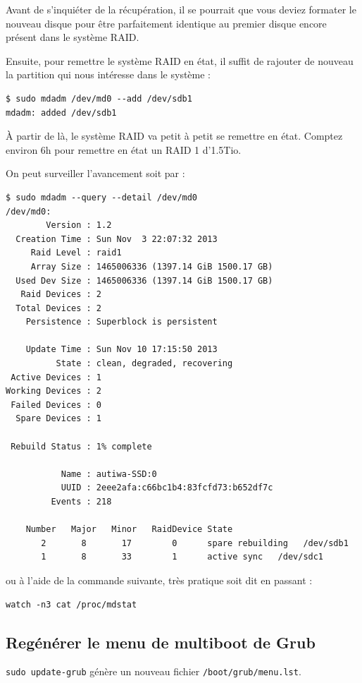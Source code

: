 \documentclass[a4paper,twoside]{article}
\begin{document}
\bigskip

\begin{remarque}
Avant de s'inquiéter de la récupération, il se pourrait que vous deviez formater le nouveau disque pour être parfaitement 
identique au premier disque encore présent dans le système RAID. 
\end{remarque}

Ensuite, pour remettre le système RAID en état, il suffit de rajouter de nouveau la partition qui nous intéresse dans le 
système : 
\begin{verbatim}
$ sudo mdadm /dev/md0 --add /dev/sdb1
mdadm: added /dev/sdb1
\end{verbatim}

À partir de là, le système RAID va petit à petit se remettre en état. Comptez environ 6h pour remettre en état un 
RAID 1 d'1.5Tio.

On peut surveiller l'avancement soit par :
\begin{verbatim}
$ sudo mdadm --query --detail /dev/md0
/dev/md0:
        Version : 1.2
  Creation Time : Sun Nov  3 22:07:32 2013
     Raid Level : raid1
     Array Size : 1465006336 (1397.14 GiB 1500.17 GB)
  Used Dev Size : 1465006336 (1397.14 GiB 1500.17 GB)
   Raid Devices : 2
  Total Devices : 2
    Persistence : Superblock is persistent

    Update Time : Sun Nov 10 17:15:50 2013
          State : clean, degraded, recovering 
 Active Devices : 1
Working Devices : 2
 Failed Devices : 0
  Spare Devices : 1

 Rebuild Status : 1% complete

           Name : autiwa-SSD:0
           UUID : 2eee2afa:c66bc1b4:83fcfd73:b652df7c
         Events : 218

    Number   Major   Minor   RaidDevice State
       2       8       17        0      spare rebuilding   /dev/sdb1
       1       8       33        1      active sync   /dev/sdc1

\end{verbatim}
ou à l'aide de la commande suivante, très pratique soit dit en passant : 
\begin{verbatim}
watch -n3 cat /proc/mdstat
\end{verbatim}


\subsection{Regénérer le menu de multiboot de Grub}
\verb|sudo update-grub| génère un nouveau fichier \verb|/boot/grub/menu.lst|.
\end{document}

